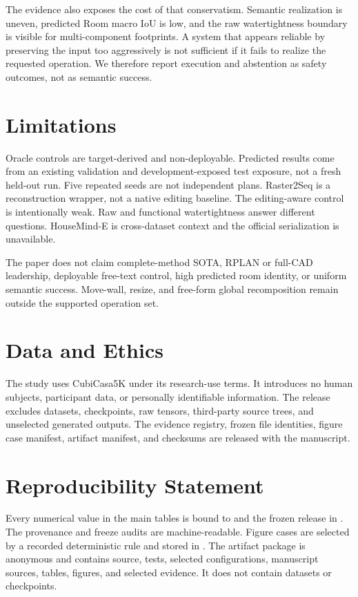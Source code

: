 \documentclass[10pt,twocolumn,letterpaper]{article}
\begin{document}
The evidence also exposes the cost of that conservatism. Semantic realization is
uneven, predicted Room macro IoU is low, and the raw watertightness boundary is
visible for multi-component footprints. A system that appears reliable by
preserving the input too aggressively is not sufficient if it fails to realize
the requested operation. We therefore report execution and abstention as safety
outcomes, not as semantic success.

\section{Limitations}
Oracle controls are target-derived and non-deployable. Predicted results come
from an existing validation and development-exposed test exposure, not a fresh
held-out run. Five repeated seeds are not independent plans. Raster2Seq is a
reconstruction wrapper, not a native editing baseline. The editing-aware control
is intentionally weak. Raw and functional watertightness answer different
questions. HouseMind-E is cross-dataset context and the official serialization is
unavailable.

The paper does not claim complete-method SOTA, RPLAN or full-CAD leadership,
deployable free-text control, high predicted room identity, or uniform semantic
success. Move-wall, resize, and free-form global recomposition remain outside the
supported operation set.

\section*{Data and Ethics}
The study uses CubiCasa5K under its research-use terms. It introduces no human
subjects, participant data, or personally identifiable information. The release
excludes datasets, checkpoints, raw tensors, third-party source trees, and
unselected generated outputs. The evidence registry, frozen file identities,
figure case manifest, artifact manifest, and checksums are released with the
manuscript.

\section*{Reproducibility Statement}
Every numerical value in the main tables is bound to
 and the frozen
release in .
The provenance and freeze audits are machine-readable. Figure cases are selected
by a recorded deterministic rule and stored in
. The artifact
package is anonymous and contains source, tests, selected configurations,
manuscript sources, tables, figures, and selected evidence. It does not contain
datasets or checkpoints.
\end{document}
